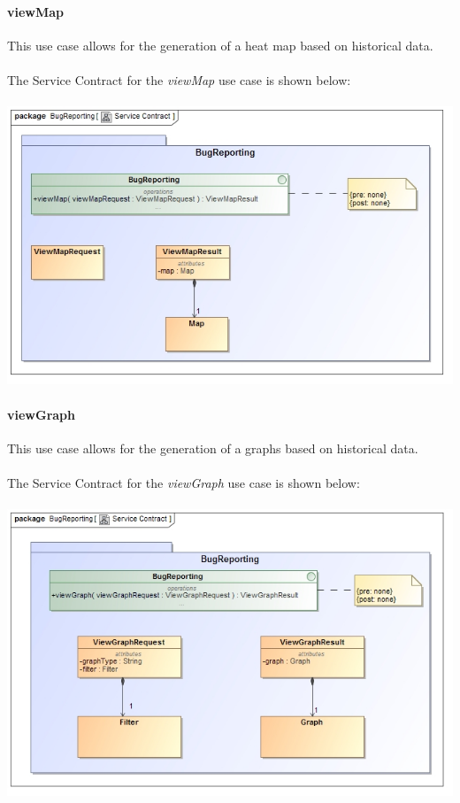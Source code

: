 \documentclass[11pt,a4paper,titlepage]{article}
\begin{document}
		\paragraph{viewMap }
		This use case allows for the generation of a heat map based on historical data.\\\hfill\\
		The Service Contract for the \textit{viewMap} use case is shown below:\\\hfill\\		
		\includegraphics[width=\linewidth]{viewMapSC}
		
		\paragraph{viewGraph }
		This use case allows for the generation of a graphs based on historical data.\\\hfill\\
		The Service Contract for the \textit{viewGraph} use case is shown below:\\\hfill\\	
		\includegraphics[width=\linewidth]{viewGraphSC}	
		
\end{document}
